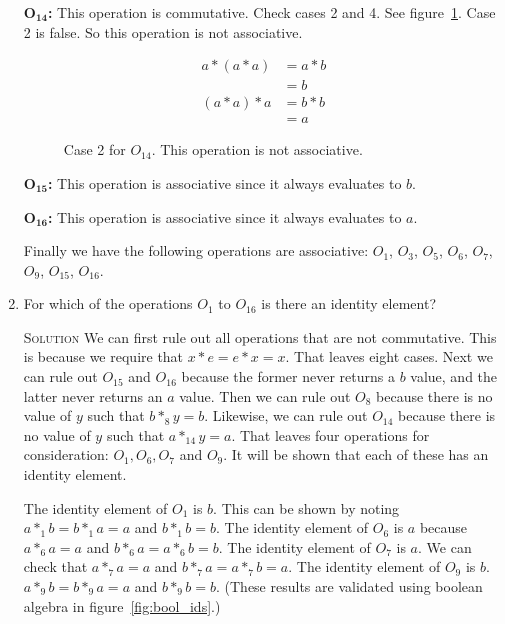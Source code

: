 \documentclass[twoside]{amsart}
\newcommand{\Solution}{\textsc{Solution}\xspace}
\begin{document}
\begin{enumerate}[label=\textbf{\arabic*}, leftmargin=1em]
   $\mathbf{O_{14}}$\textbf{:} This operation is commutative. Check cases
   2 and 4. See figure~\ref{fig:o14_assoc}. Case 2 is false. So this
   operation is not associative.

   \begin{figure}
      \caption{Case 2 for $O_{14}$. This operation is not associative.}
      \label{fig:o14_assoc}
      \begin{align*}
         a * (a * a) & = a * b \\
	             & = b \\
         (a * a) * a & = b * b \\
	             & = a
      \end{align*}
   \end{figure}

   $\mathbf{O_{15}}$\textbf{:} This operation is associative since it
   always evaluates to $b$.

   $\mathbf{O_{16}}$\textbf{:} This operation is associative since
   it always evaluates to $a$.

   Finally we have the following operations are associative: $O_1$, 
   $O_3$, $O_5$, $O_6$, $O_7$, $O_9$, $O_15$, $O_16$.

   \item For which of the operations $O_1$ to $O_{16}$ is there an 
   identity element?

   \noindent \Solution We can first rule out all operations that are not
   commutative. This is because we require that $x*e=e*x=x$. That leaves
   eight cases. Next we can rule out $O_{15}$ and $O_{16}$ because the
   former never returns a $b$ value, and the latter never returns an $a$
   value. Then we can rule out $O_8$ because there is no value of $y$ such
   that $b *_8 y = b$. Likewise, we can rule out $O_{14}$ because there
   is no value of $y$ such that $a *_{14} y = a$. That leaves four operations
   for consideration: $O_1, O_6, O_7$ and $O_9$. It will be shown
   that each of these has an identity element.

   The identity element of $O_1$ is $b$. This can be shown by noting
   $a *_{1} b = b *_{1} a = a$ and $b *_1 b = b$. The identity element
   of $O_6$ is $a$ because $a *_6 a = a$ and $b *_6 a = a *_6 b = b$.
   The identity element of $O_7$ is $a$. We can check that $a *_7 a = a$ and
   $b *_7 a = a *_7 b = a$. The identity element of $O_9$ is $b$.
   $a *_9 b = b *_9 a = a$ and $b *_9 b = b$. (These results are
   validated using boolean algebra in figure~\ref{fig:bool_ids}.)


\end{enumerate}
\end{document}
